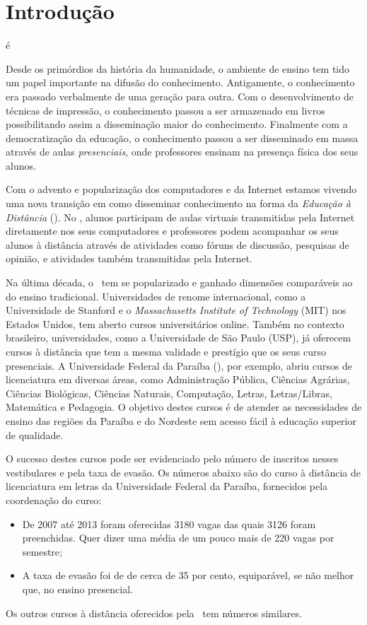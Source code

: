 \chapter{Introdução}

é

Desde os primórdios da história da humanidade, o ambiente de ensino tem tido um papel
importante na difusão do conhecimento. Antigamente, o conhecimento era passado
verbalmente de uma geração para outra. Com o desenvolvimento de técnicas de
impressão, o conhecimento
passou a ser armazenado em livros possibilitando assim a disseminação maior do conhecimento. 
Finalmente com a democratização da educação, o conhecimento passou a ser disseminado em massa 
através de aulas \emph{presenciais}, onde professores ensinam na presença física dos seus alunos. 

Com o advento e popularização dos computadores e da Internet 
estamos vivendo uma nova transição em como disseminar conhecimento na forma da \emph{Educação à Distância} (\ead). 
No \ead, alunos participam de aulas virtuais transmitidas pela Internet
diretamente nos seus computadores
e professores podem acompanhar os seus alunos à distância através de atividades como 
fóruns de discussão, pesquisas de opinião, e atividades também transmitidas
pela Internet.

Na última década, o \ead\ tem se popularizado e ganhado dimensões comparáveis ao do ensino  
tradicional. Universidades de renome internacional, como a Universidade de Stanford e o \emph{Massachusetts Institute of 
Technology} (MIT) nos Estados Unidos, tem aberto cursos universitários online. Também no contexto brasileiro, 
universidades, como a Universidade de São Paulo (USP), já oferecem cursos 
à distância que tem a mesma validade e prestígio que os seus curso presenciais. 
A Universidade Federal da Paraíba (\ufpb), por exemplo, abriu cursos de licenciatura em 
diversas áreas, como Administração Pública, Ciências Agrárias, Ciências Biológicas, Ciências Naturais,
Computação, Letras, Letras/Libras, Matemática e Pedagogia. O objetivo destes cursos
é de atender as necessidades de ensino das regiões da Paraíba e do Nordeste sem acesso fácil
à educação superior de qualidade. 

O sucesso destes cursos pode ser evidenciado pelo número de inscritos nesses vestibulares e pela taxa de 
evasão. Os números abaixo são do curso à distância de licenciatura em letras da Universidade Federal da Paraíba, fornecidos pela 
coordenação do curso:
\begin{itemize}
 \item De 2007 até 2013 foram oferecidas 3180 vagas das quais 3126 foram preenchidas. 
 Quer dizer uma média de um pouco mais de 220 vagas por semestre;
 
 \item A taxa de evasão  foi de de cerca de 
35 por cento, equiparável, se não melhor que, no ensino presencial.
\end{itemize}
 Os outros cursos à distância oferecidos pela \ufpb\  tem números similares.


